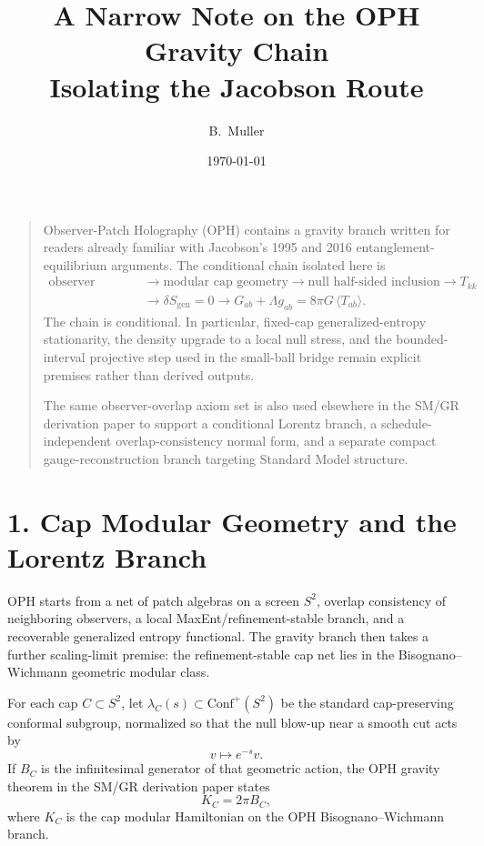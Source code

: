 \documentclass[10pt]{article}
\title{A Narrow Note on the OPH Gravity Chain\\[0.3em]\large Isolating the Jacobson Route}
\author{B.\ Muller}
\date{\today}
\newcommand{\Conf}{\mathrm{Conf}}
\begin{document}
\maketitle

\begin{quote}\small
Observer-Patch Holography (OPH) contains a gravity branch written for readers already familiar with Jacobson's 1995 and 2016 entanglement-equilibrium arguments. The conditional chain isolated here is
\[
\begin{aligned}
\text{observer overlap}
&\to \text{modular cap geometry}
\to \text{null half-sided inclusion}
\to T_{kk} \\
&\to \delta S_{\mathrm{gen}}=0
\to G_{ab}+\Lambda g_{ab}=8\pi G\,\langle T_{ab}\rangle.
\end{aligned}
\]
The chain is conditional. In particular, fixed-cap generalized-entropy stationarity, the density upgrade to a local null stress, and the bounded-interval projective step used in the small-ball bridge remain explicit premises rather than derived outputs.

The same observer-overlap axiom set is also used elsewhere in the SM/GR derivation paper to support a conditional Lorentz branch, a schedule-independent overlap-consistency normal form, and a separate compact gauge-reconstruction branch targeting Standard Model structure.
\end{quote}

\section*{1. Cap Modular Geometry and the Lorentz Branch}

OPH starts from a net of patch algebras on a screen \(S^2\), overlap consistency of neighboring observers, a local MaxEnt/refinement-stable branch, and a recoverable generalized entropy functional. The gravity branch then takes a further scaling-limit premise: the refinement-stable cap net lies in the Bisognano--Wichmann geometric modular class.

For each cap \(C \subset S^2\), let \(\lambda_C(s) \subset \Conf^+(S^2)\) be the standard cap-preserving conformal subgroup, normalized so that the null blow-up near a smooth cut acts by
\[
v \mapsto e^{-s} v.
\]
If \(B_C\) is the infinitesimal generator of that geometric action, the OPH gravity theorem in the SM/GR derivation paper states
\[
K_C = 2\pi B_C,
\]
where \(K_C\) is the cap modular Hamiltonian on the OPH Bisognano--Wichmann branch.
\end{document}
